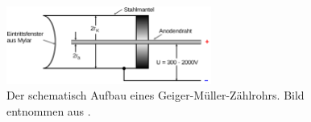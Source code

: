 \begin{figure}
    \centering
    \includegraphics[width=0.6\textwidth]{content/data/rohre.png}
    \caption{Der schematisch Aufbau eines Geiger-Müller-Zählrohrs. Bild entnommen aus \cite{anleitung}.}
    \label{fig:geiger}
\end{figure}